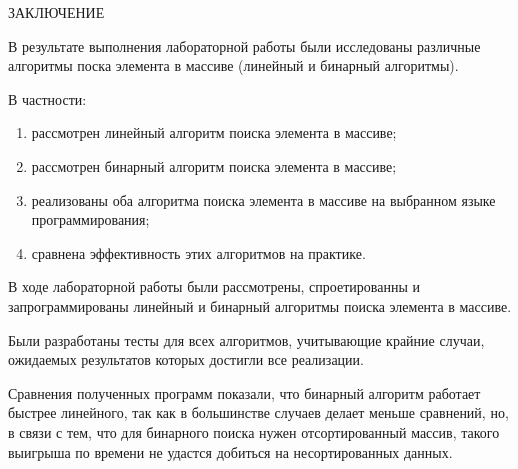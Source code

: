 \begin{center}
    \MakeUppercase{\large Заключение}
\end{center}

В результате выполнения лабораторной работы были исследованы различные алгоритмы поска элемента в массиве (линейный и бинарный алгоритмы).

\vspace{0.25cm}
В частности:

\begin{enumerate}

\item рассмотрен линейный алгоритм поиска элемента в массиве;

\item рассмотрен бинарный алгоритм поиска элемента в массиве;

\item реализованы оба алгоритма поиска элемента в массиве на выбранном языке программирования;

\item сравнена эффективность этих алгоритмов на практике.

\end{enumerate}

В ходе лабораторной работы были рассмотрены, спроетированны и запрограммированы линейный и бинарный алгоритмы поиска элемента в массиве.

Были разработаны тесты для всех алгоритмов, учитывающие крайние случаи, ожидаемых результатов которых достигли все реализации.

Сравнения полученных программ показали, что бинарный алгоритм работает быстрее линейного, так как в большинстве случаев делает меньше сравнений, но, в связи с тем, что для бинарного поиска нужен отсортированный массив, такого выигрыша по времени не удастся добиться на несортированных данных.

\newpage